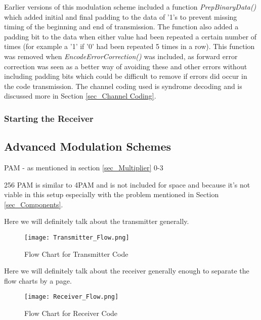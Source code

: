 \documentclass[../main.tex]{subfiles}
\begin{document}
Earlier versions of this modulation scheme included a function \textit{Prep\textunderscore Binary\textunderscore Data()} which added initial and final padding to the data of '1's to prevent missing timing of the beginning and end of transmission.
The function also added a padding bit to the data when either value had been repeated a certain number of times (for example a '1' if '0' had been repeated 5 times in a row).
This function was removed when \textit{Encode\textunderscore Error\textunderscore Correction()} was included, as forward error correction was seen as a better way of avoiding these and other errors without including padding bits which could be difficult to remove if errors did occur in the code transmission.
The channel coding used is syndrome decoding and is discussed more in Section \ref{sec_Channel Coding}.




\subsubsection{Starting the Receiver}

\subsection{Advanced Modulation Schemes} \label{sec_Advanced Modulation Schemes}

PAM - as mentioned in section \ref{sec_Multiplier} 0-3

256 PAM is similar to 4PAM and is not included for space and because it's not viable in this setup especially with the problem mentioned in Section \ref{sec_Components}.

Here we will definitely talk about the transmitter generally.\\

\begin{figure}[ht]
	\centering
	\texttt{[image: Transmitter\_Flow.png]}
	\caption{Flow Chart for Transmitter Code}
	\label{fig_Transmitter_Flow}
\end{figure}

Here we will definitely talk about the receiver generally enough to separate the flow charts by a page.\\

\begin{figure}[ht]
	\centering
	\texttt{[image: Receiver\_Flow.png]}
	\caption{Flow Chart for Receiver Code}
	\label{fig_Receiver_Flow}
\end{figure}
\end{document}
